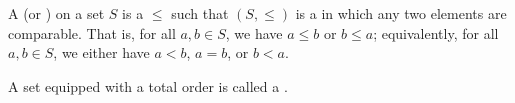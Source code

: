 \begin{definition} \label{definition:total_order_linear_order_on_a_set}
A  (or ) on a set $S$ is a  $\leq$ such that $(S, \leq)$ is a  in which any two elements are comparable. That is, for all $a, b \in S$, we have $a \leq b$ or $b \leq a$; equivalently, for all $a,b \in S$, we either have $a < b$, $a = b$, or $b < a$.

A set equipped with a total order is called a .
\end{definition}
